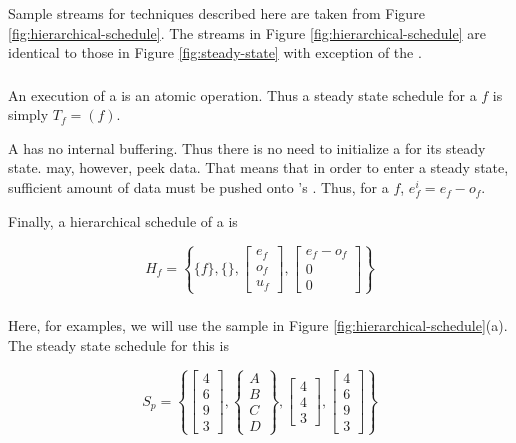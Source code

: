 Sample streams for techniques described here are taken from Figure
\ref{fig:hierarchical-schedule}.  The streams in Figure
\ref{fig:hierarchical-schedule} are identical to those in Figure
\ref{fig:steady-state} with exception of the {\feedbackloop}.

\subsubsection{\filters}

An execution of a {\filter} is an atomic operation.  Thus a steady
state schedule for a {\filter} $f$ is simply $T_f = (f)$.

A {\filter} has no internal buffering.  Thus there is no need to
initialize a {\filter} for its steady state.  {\filters} may, however,
peek data.  That means that in order to enter a steady state,
sufficient amount of data must be pushed onto {\filter}'s {\Input}
{{\Channel}}.  Thus, for a {\filter} $f$, $e^i_f = e_f - o_f$.

Finally, a hierarchical schedule of a {\filter} is

\begin{displaymath}
H_f = \left\{\{f\}, \{\}, \left[
\begin{array}{c}
e_f\\o_f\\u_f
\end{array}\right], \left[
\begin{array}{c}
e_f-o_f\\0\\0\end{array}\right] \right\}
\end{displaymath}

\subsubsection{\pipelines}

Here, for examples, we will use the sample {\pipeline} in Figure
\ref{fig:hierarchical-schedule}(a).  The steady state schedule for
this {\pipeline} is

\begin{displaymath}
S_p = \left\{ \left[
\begin{array}{c} 4 \\ 6 \\ 9 \\ 3 \end{array} \right], \left\{
\begin{array}{c} A \\ B \\ C \\ D \end{array} \right\},\left[
\begin{array}{c} 4 \\ 4 \\ 3 \end{array}\right], \left[
\begin{array}{c} 4\\ 6\\ 9\\ 3 \end{array} \right]\right\}
\end{displaymath}

